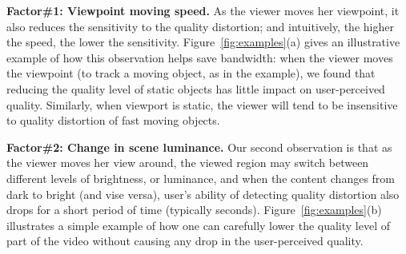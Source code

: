 
\begin{packeditemize}

\item {\bf Factor\#1: Viewpoint moving speed.} 
As the viewer moves her viewpoint, it also reduces the sensitivity to the quality distortion; and intuitively, the higher the speed, the lower the sensitivity. 
Figure~\ref{fig:examples}(a) gives an illustrative example of how this observation helps save bandwidth: when the viewer moves the viewpoint (\eg to track a moving object, as in the example), we found that reducing the quality level of static objects has little impact on user-perceived quality.
Similarly, when viewport is static, the viewer will tend to be insensitive to quality distortion of fast moving objects. 


\item {\bf Factor\#2: Change in scene luminance.} 
Our second observation is that as the viewer moves her view around, the viewed region may switch between different levels of brightness, or luminance, and when the content changes from dark to bright (and vise versa), user's ability of detecting quality distortion also drops for a short period of time (typically \fillme seconds).
Figure~\ref{fig:examples}(b) illustrates a simple example of how one can carefully lower the quality level of part of the video without causing any drop in the user-perceived quality.



\end{packeditemize}
